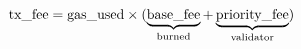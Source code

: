 \documentclass[preview]{standalone}
\begin{document}
\begin{align*}
\special{dvisvgm:raw <g id='unique000'>}\text{tx\_fee} = \text{gas\_used} \times (\underbrace{\text{base\_fee}}_{\text{burned}} + \underbrace{\text{priority\_fee}}_{\text{validator}})\special{dvisvgm:raw </g>}
\end{align*}
\end{document}
